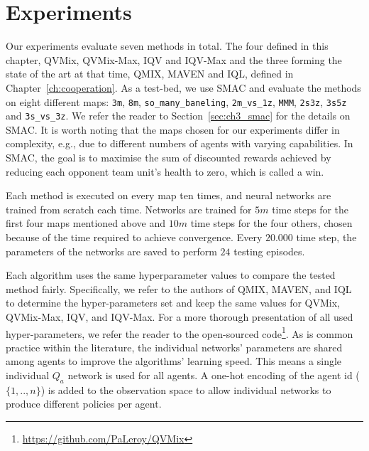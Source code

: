 \section{Experiments} \label{sec:ch4_experiments}

Our experiments evaluate seven methods in total.
The four defined in this chapter, QVMix, QVMix-Max, IQV and IQV-Max and the three forming the state of the art at that time, QMIX, MAVEN and IQL, defined in Chapter~\ref{ch:cooperation}.
As a test-bed, we use SMAC and evaluate the methods on eight different maps: \texttt{3m}, \texttt{8m}, \texttt{so\_many\_baneling}, \texttt{2m\_vs\_1z}, \texttt{MMM}, \texttt{2s3z}, \texttt{3s5z} and \texttt{3s\_vs\_3z}. 
We refer the reader to Section~\ref{sec:ch3_smac} for the details on SMAC.
It is worth noting that the maps chosen for our experiments differ in complexity, e.g., due to different numbers of agents with varying capabilities.
In SMAC, the goal is to maximise the sum of discounted rewards achieved by reducing each opponent team unit's health to zero, which is called a win.

Each method is executed on every map ten times, and neural networks are trained from scratch each time.
Networks are trained for $5m$ time steps for the first four maps mentioned above and $10m$ time steps for the four others, chosen because of the time required to achieve convergence.
Every $20.000$ time step, the parameters of the networks are saved to perform $24$ testing episodes.

Each algorithm uses the same hyperparameter values to compare the tested method fairly.
Specifically, we refer to the authors of QMIX, MAVEN, and IQL to determine the hyper-parameters set and keep the same values for QVMix, QVMix-Max, IQV, and IQV-Max. 
For a more thorough presentation of all used hyper-parameters, we refer the reader to the open-sourced code\footnote{\url{https://github.com/PaLeroy/QVMix}}.
As is common practice within the literature, the individual networks' parameters are shared among agents to improve the algorithms' learning speed.
This means a single individual $Q_a$ network is used for all agents.
A one-hot encoding of the agent id ($\{1,..,n\}$) is added to the observation space to allow individual networks to produce different policies per agent.

